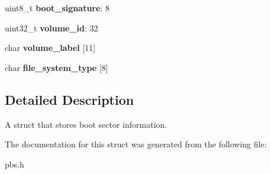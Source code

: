 \begin{DoxyCompactItemize}
\item 
\hypertarget{struct_b_o_o_t___s_e_c_t_o_r_aeb2214e6a7fc7f88e6e5bd1304927183}{}uint8\+\_\+t {\bfseries boot\+\_\+signature}\+: 8\label{struct_b_o_o_t___s_e_c_t_o_r_aeb2214e6a7fc7f88e6e5bd1304927183}

\item 
\hypertarget{struct_b_o_o_t___s_e_c_t_o_r_a04a0626139a866e5fa6f3dcd87219630}{}uint32\+\_\+t {\bfseries volume\+\_\+id}\+: 32\label{struct_b_o_o_t___s_e_c_t_o_r_a04a0626139a866e5fa6f3dcd87219630}

\item 
\hypertarget{struct_b_o_o_t___s_e_c_t_o_r_a1cd9558e7f4205e12e0a691caff255a8}{}char {\bfseries volume\+\_\+label} \mbox{[}11\mbox{]}\label{struct_b_o_o_t___s_e_c_t_o_r_a1cd9558e7f4205e12e0a691caff255a8}

\item 
\hypertarget{struct_b_o_o_t___s_e_c_t_o_r_a2d8fd98b8f10cd4b82597e57c28dd92b}{}char {\bfseries file\+\_\+system\+\_\+type} \mbox{[}8\mbox{]}\label{struct_b_o_o_t___s_e_c_t_o_r_a2d8fd98b8f10cd4b82597e57c28dd92b}

\end{DoxyCompactItemize}


\subsection{Detailed Description}
A struct that stores boot sector information. 

The documentation for this struct was generated from the following file\+:\begin{DoxyCompactItemize}
\item 
pbs.\+h\end{DoxyCompactItemize}
